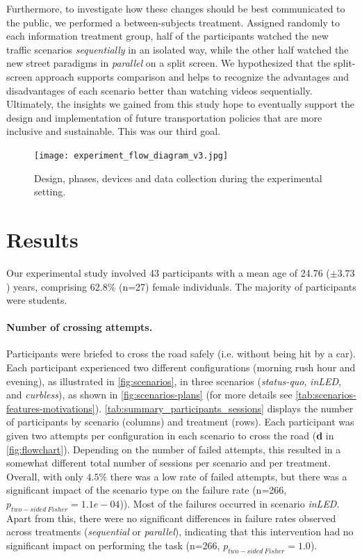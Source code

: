 Furthermore, to investigate how these changes should be best communicated to the public, we performed a between-subjects treatment. Assigned randomly to each information treatment group, half of the participants watched the new traffic scenarios \emph{sequentially} in an isolated way, while the other half watched the new street paradigms in \emph{parallel} on a split screen. We hypothesized that the split-screen approach supports comparison and helps to recognize the advantages and disadvantages of each scenario better than watching videos sequentially. Ultimately, the insights we gained from this study hope to eventually support the design and implementation of future transportation policies that are more inclusive and sustainable. This was our third goal. 


\begin{figure}[t!]
    \centering
    \texttt{[image: experiment\_flow\_diagram\_v3.jpg]}
    \caption{Design, phases, devices and data collection during the experimental setting.}
   \label{fig:flowchart}
\end{figure}


\section{Results}
Our experimental study involved 43 participants with a mean age of 24.76 ($\pm3.73$) years, comprising 62.8\% (n=27) female individuals. The majority of participants were students.

\paragraph{Number of crossing attempts.}



Participants were briefed to cross the road safely (i.e. without being hit by a car). Each participant experienced two different configurations (morning rush hour and evening), as illustrated in \autoref{fig:scenarios}, in three scenarios (\emph{status-quo}, \emph{inLED}, and \emph{curbless}), as shown in \autoref{fig:scenarios-plans} (for more details see \autoref{tab:scenarios-features-motivations}). 
\autoref{tab:summary_participants_sessions} displays the number of participants by scenario (columns) and treatment (rows). 
Each participant was given two attempts per configuration in each scenario to cross the road (\textbf{d} in \autoref{fig:flowchart}). Depending on the number of failed attempts, this resulted in a somewhat different total number of sessions per scenario and per treatment. 
Overall, with only $4.5\%$ there was a low rate of failed attempts, but there was a significant impact of the scenario type on the failure rate (n=266, $p_{two-sided\ Fisher}=1.1e-04$)). Most of the failures occurred in scenario \emph{inLED}. 
Apart from this, there were no significant differences in failure rates observed across treatments (\textit{sequential} or \textit{parallel}), indicating that this intervention had no significant impact on performing the task (n=266, $p_{two-sided\ Fisher}=1.0$). 

